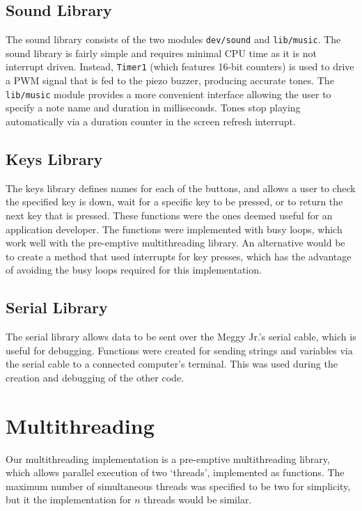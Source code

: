 \documentclass[a4paper,10pt]{article}
\begin{document}
\subsection*{Sound Library}
\label{sub:Sound Library}

The sound library consists of the two modules \texttt{dev/sound} and
\texttt{lib/music}. The sound library is fairly simple and requires minimal
CPU time as it is not interrupt driven. Instead, \texttt{Timer1} (which
features 16-bit counters) is used to drive a PWM signal that is fed to the
piezo buzzer, producing accurate tones. The \texttt{lib/music} module provides
a more convenient interface allowing the user to specify a note name and
duration in milliseconds. Tones stop playing automatically via a duration
counter in the screen refresh interrupt.

\subsection*{Keys Library}
The keys library defines names for each of the buttons, and allows a user to
check the specified key is down, wait for a specific key to be pressed, or to
return the next key that is pressed. These functions were the ones deemed
useful for an application developer.  The functions were implemented with busy
loops, which work well with the pre-emptive multithreading library. An
alternative would be to create a method that used interrupts for key presses,
which has the advantage of avoiding the busy loops required for this
implementation.

\subsection*{Serial Library}
The serial library allows data to be sent over the Meggy Jr.'s serial cable,
which is useful for debugging. Functions were created for sending strings and
variables via the serial cable to a connected computer's terminal. This was
used during the creation and debugging of the other code.

\section*{Multithreading}

Our multithreading implementation is a pre-emptive multithreading library,
which allows parallel execution of two `threads', implemented as functions.
The maximum number of simultaneous threads was specified to be two for
simplicity, but it the implementation for $n$ threads would be similar.
\end{document}
